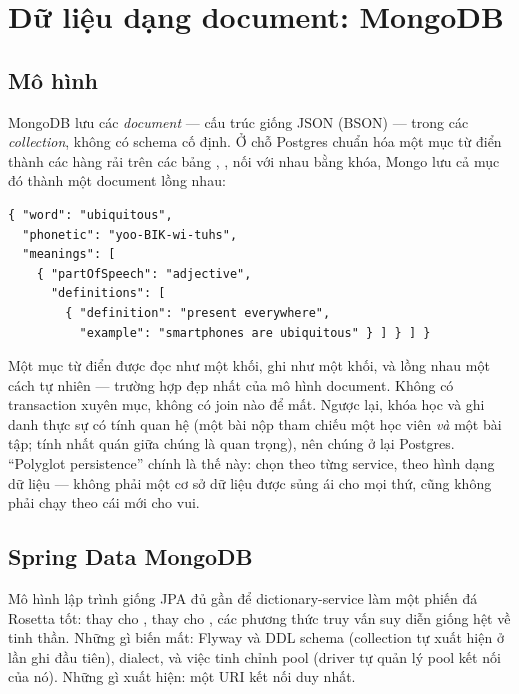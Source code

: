 \chapter{Dữ liệu dạng document: MongoDB}
\label{ch:mongodb}

\section{Mô hình}

MongoDB lưu các \emph{document} --- cấu trúc giống JSON (BSON) --- trong
các \emph{collection}, không có schema cố định. Ở chỗ Postgres chuẩn hóa
một mục từ điển thành các hàng rải trên các bảng ,
,  nối với nhau bằng khóa, Mongo lưu cả
mục đó thành một document lồng nhau:

\begin{lstlisting}
{ "word": "ubiquitous",
  "phonetic": "yoo-BIK-wi-tuhs",
  "meanings": [
    { "partOfSpeech": "adjective",
      "definitions": [
        { "definition": "present everywhere",
          "example": "smartphones are ubiquitous" } ] } ] }
\end{lstlisting}

\begin{decision}
Một mục từ điển được đọc như một khối, ghi như một khối, và lồng nhau
một cách tự nhiên --- trường hợp đẹp nhất của mô hình document. Không có
transaction xuyên mục, không có join nào để mất. Ngược lại, khóa học và
ghi danh thực sự có tính quan hệ (một bài nộp tham chiếu một học viên
\emph{và} một bài tập; tính nhất quán giữa chúng là quan trọng), nên
chúng ở lại Postgres. ``Polyglot persistence'' chính là thế này: chọn
theo từng service, theo hình dạng dữ liệu --- không phải một cơ sở dữ
liệu được sủng ái cho mọi thứ, cũng không phải chạy theo cái mới cho vui.
\end{decision}

\section{Spring Data MongoDB}

Mô hình lập trình giống JPA đủ gần để dictionary-service làm một phiến đá
Rosetta tốt:  thay cho ,
 thay cho , các phương thức
truy vấn suy diễn giống hệt về tinh thần. Những gì biến mất: Flyway và
DDL schema (collection tự xuất hiện ở lần ghi đầu tiên), dialect, và
việc tinh chỉnh pool (driver tự quản lý pool kết nối của nó). Những gì
xuất hiện: một URI kết nối duy nhất.

